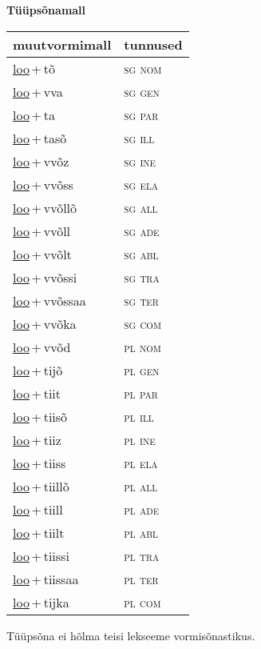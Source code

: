 
\vspace{1.8em}
\begin{minipage}{\textwidth}
\textbf{Tüüpsõnamall \,}\\

\begin{sideways}
\begin{tabular}{l l}
muutvormimall & tunnused \\
\hline
\underline{loo}\,+\,tõ & \textsc{ sg nom } \\
\underline{loo}\,+\,vva & \textsc{ sg gen } \\
\underline{loo}\,+\,ta & \textsc{ sg par } \\
\underline{loo}\,+\,tasõ & \textsc{ sg ill } \\
\underline{loo}\,+\,vvõz & \textsc{ sg ine } \\
\underline{loo}\,+\,vvõss & \textsc{ sg ela } \\
\underline{loo}\,+\,vvõllõ & \textsc{ sg all } \\
\underline{loo}\,+\,vvõll & \textsc{ sg ade } \\
\underline{loo}\,+\,vvõlt & \textsc{ sg abl } \\
\underline{loo}\,+\,vvõssi & \textsc{ sg tra } \\
\underline{loo}\,+\,vvõssaa & \textsc{ sg ter } \\
\underline{loo}\,+\,vvõka & \textsc{ sg com } \\
\underline{loo}\,+\,vvõd & \textsc{ pl nom } \\
\underline{loo}\,+\,tijõ & \textsc{ pl gen } \\
\underline{loo}\,+\,tiit & \textsc{ pl par } \\
\underline{loo}\,+\,tiisõ & \textsc{ pl ill } \\
\underline{loo}\,+\,tiiz & \textsc{ pl ine } \\
\underline{loo}\,+\,tiiss & \textsc{ pl ela } \\
\underline{loo}\,+\,tiillõ & \textsc{ pl all } \\
\underline{loo}\,+\,tiill & \textsc{ pl ade } \\
\underline{loo}\,+\,tiilt & \textsc{ pl abl } \\
\underline{loo}\,+\,tiissi & \textsc{ pl tra } \\
\underline{loo}\,+\,tiissaa & \textsc{ pl ter } \\
\underline{loo}\,+\,tijka & \textsc{ pl com } \\
\end{tabular}
\end{sideways}
\label{tab:tüüpsõnamall-lootõ}

\end{minipage}

 
\vspace{1em}
\noindent Tüüpsõna ei hõlma teisi lekseeme vormi\-sõnastikus.
